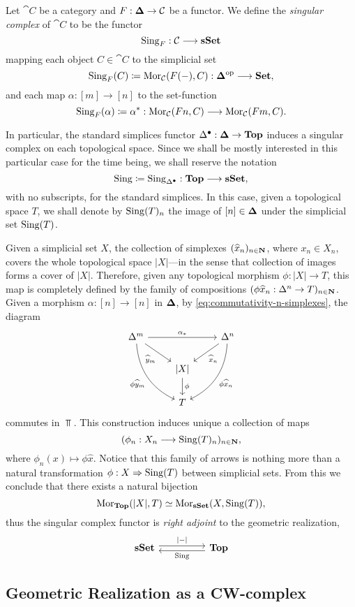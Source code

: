 \begin{definition}
\label{def:singular-complex-functor}
Let \(\cat C\) be a category and \(F: {\mathbf{\Delta}} \to \mathcal C\) be a functor. We define
the \emph{singular complex} of \(\cat C\) to be the functor
\[
\operatorname{Sing}_F: \mathcal C \longrightarrow {\textbf{sSet}}
\]
mapping each object \(C \in \cat C\) to the simplicial set
\[
\operatorname{Sing}_F(C) \coloneq \operatorname{Mor}_{\mathcal C}(F(-), C): {\mathbf{\Delta}}^{\mathrm{op}} \longrightarrow {\textbf{Set}},
\]
and each map \(\alpha: [m] \to [n]\) to the set-function
\[
\operatorname{Sing}_F(\alpha) \coloneq \alpha^{*}:
\operatorname{Mor}_{\mathcal C}(F n, C) \longrightarrow \operatorname{Mor}_{\mathcal C}(F m, C).
\]

In particular, the standard simplices functor \(\Delta^{\bullet}: {\mathbf{\Delta}} \to
{\textbf{Top}}\) induces a singular complex on each topological space. Since we shall be
mostly interested in this particular case for the time being, we shall reserve
the notation
\[
\operatorname{Sing} \coloneq \operatorname{Sing}_{\Delta^{\bullet}}: {\textbf{Top}} \longrightarrow {\textbf{sSet}},
\]
with no subscripts, for the standard simplices. In this case, given a
topological space \(T\), we shall denote by \(\operatorname{Sing}(T)_n\) the image of
\([n] \in {\mathbf{\Delta}}\) under the simplicial set \(\operatorname{Sing}(T)\).
\end{definition}

Given a simplicial set \(X\), the collection of simplexes
\((\widehat{x}_n)_{n \in \mathbf{N}}\), where \(x_n \in X_n\), covers the whole
topological space \(|X|\)---in the sense that collection of images forms a cover
of \(|X|\). Therefore, given any topological morphism \(\phi: |X| \to T\), this
map is completely defined by the family of compositions
\((\phi \widehat{x}_n: \Delta^n \to T)_{n \in \mathbf{N}}\). Given a morphism
\(\alpha: [n] \to [n]\) in \({\mathbf{\Delta}}\), by \cref{eq:commutativity-n-simplexes},
the diagram
\[
\begin{tikzcd}
\Delta^m \ar[rr, "\alpha_{*}"]
\ar[rd, "\widehat y_m"']
\ar[drd, bend right, "\phi \widehat y_m"']
& &\Delta^n \ar[ld, "\widehat x_n"]
\ar[dld, bend left, "\phi \widehat x_n"] \\
&{|X|} \ar[d, "\phi"] & \\
&T &
\end{tikzcd}
\]
commutes in \(\Top\). This construction induces unique a collection of maps
\[
(\phi_n: X_n \longrightarrow \operatorname{Sing}(T)_n)_{n \in \mathbf{N}},
\]
where \(\phi_n(x) \mapsto \phi \widehat x\). Notice that this family of arrows
is nothing more than a natural transformation \(\phi: X \Rightarrow \operatorname{Sing}(T)\) between
simplicial sets. From this we conclude that there exists a natural bijection
\[
\operatorname{Mor}_{{\textbf{Top}}}(|X|, T) \simeq \operatorname{Mor}_{{\textbf{sSet}}}(X, \operatorname{Sing}(T)),
\]
thus the singular complex functor is \emph{right adjoint} to the geometric
realization,
\[
\begin{tikzcd}
\sSet \ar[rr, shift left, "{|-|}"] &&\Top \ar[ll, shift left, "\Sing"]
\end{tikzcd}
\]

\subsection{Geometric Realization as a CW-complex}




